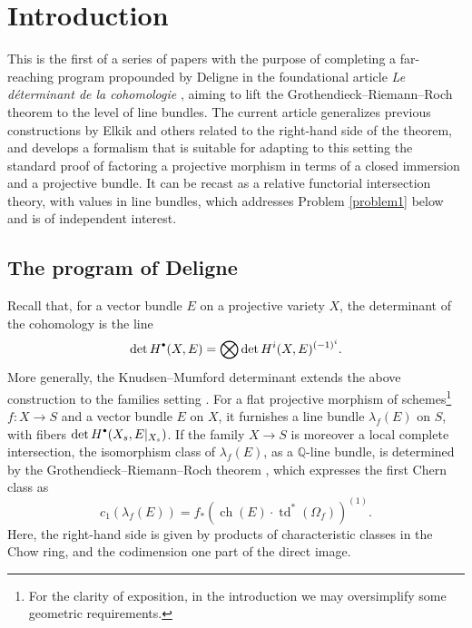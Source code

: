 \documentclass[JEP,XML,SOM,Unicode,published]{cedram}
\newcommand{\sbullet}{{\scriptscriptstyle\bullet}}
\newcommand{\csbullet}{{\raisebox{1pt}{$\sbullet$}}}
\theoremstyle{plain}
\theoremstyle{definition}
\newcommand{\QBbb}{\mathbb Q}
\DeclareMathOperator{\ch}{ch}
\DeclareMathOperator{\td}{td}
\begin{document}
\tableofcontents
\mainmatter

\section{Introduction}
This is the first of a series of papers with the purpose of completing a far-reaching program propounded by Deligne in the foundational article \emph{Le déterminant de la cohomologie} \cite{Deligne-determinant}, aiming to lift the Grothendieck--Riemann--Roch theorem to the level of line bundles. The current article generalizes previous constructions by Elkik \cite{Elkikfib} and others related to the right-hand side of the theorem, and develops a formalism that is suitable for adapting to this setting the standard proof of factoring a projective morphism in terms of a closed immersion and a projective bundle. It can be recast as a relative functorial intersection theory, with values in line bundles, which addresses Problem \ref{problem1} below and is of independent interest.

\subsection{The program of Deligne}
Recall that, for a vector bundle $E$ on a projective variety $X$, the determinant of the cohomology is the line
\begin{displaymath}
\det H^{\csbullet}(X,E) = \bigotimes \det H^i(X,E)^{(-1)^i}.
\end{displaymath}
More generally, the Knudsen--Mumford determinant extends the above construction to the families setting \cite{KnudsenMumford}. For a flat projective morphism of schemes\footnote{For the clarity of exposition, in the introduction we may oversimplify some geometric requirements.} $f\colon X\to S$ and a vector bundle $E$ on $X$, it furnishes a line bundle $\lambda_{f}(E)$ on $S$, with fibers $\det H^{\csbullet}(X_{s},E|_{X_{s}})$. If the family $X\to S$ is moreover a local complete intersection, the isomorphism class of $\lambda_{f}(E)$, as a $\QBbb$-line bundle, is determined by the Grothendieck--Riemann--Roch theorem \cite{SGA6}, which expresses the first Chern class as
\begin{equation}\label{eq:GRR}
c_1(\lambda_{f}(E)) = f_\ast \left(\ch(E) \cdot \td^{\ast}(\Omega_f) \right)^{(1)}.
\end{equation}
Here, the right-hand side is given by products of characteristic classes in the Chow ring, and the codimension one part of the direct image.
\end{document}
